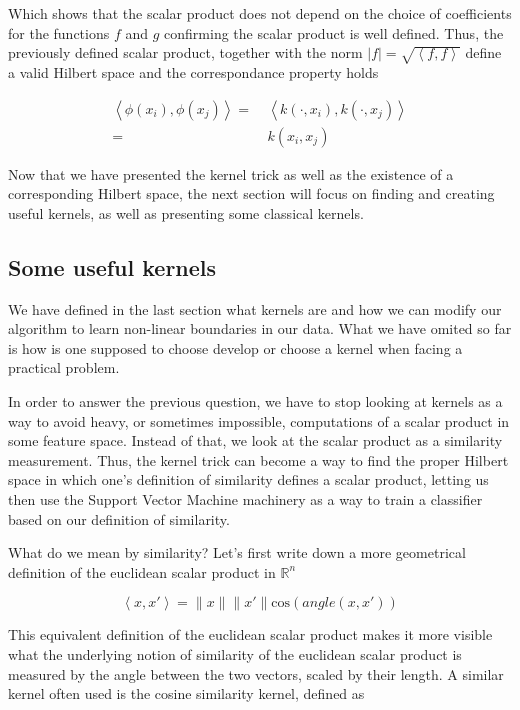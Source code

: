 Which shows that the scalar product does not depend on the choice of coefficients for the functions $f$ and $g$ confirming the scalar product is well defined. Thus, the previously defined scalar product, together with the norm $|f| = \sqrt{\left<f, f\right>}$ define a valid Hilbert space and the correspondance property holds

\begin{equation*}
  \begin{aligned}
    \left<\phi(x_i), \phi(x_j)\right> =\ &\left<k\left(\cdot, x_i\right), k\left(\cdot, x_j\right)\right>\\
    =\ &k(x_i, x_j)
  \end{aligned}
\end{equation*}

Now that we have presented the kernel trick as well as the existence of a corresponding Hilbert space, the next section will focus on finding and creating useful kernels, as well as presenting some classical kernels.

\subsection {Some useful kernels}

We have defined in the last section what kernels are and how we can modify our algorithm to learn non-linear boundaries in our data. What we have omited so far is how is one supposed to choose develop or choose a kernel when facing a practical problem.

In order to answer the previous question, we have to stop looking at kernels as a way to avoid heavy, or sometimes impossible, computations of a scalar product in some feature space. Instead of that, we look at the scalar product as a similarity measurement. Thus, the kernel trick can become a way to find the proper Hilbert space in which one's definition of similarity defines a scalar product, letting us then use the Support Vector Machine machinery as a way to train a classifier based on our definition of similarity.

What do we mean by similarity? Let's first write down a more geometrical  definition of the euclidean scalar product in $\mathbb{R}^n$ 

\begin{equation*}
  \left<x, x'\right> = \|x\|\|x'\|\text{cos}\left(angle\left(x, x'\right)
  \right)
\end{equation*}

This equivalent definition of the euclidean scalar product makes it more visible what the underlying notion of similarity of the euclidean scalar product is measured by the angle between the two vectors, scaled by their length. A similar kernel often used is the cosine similarity kernel, defined as

